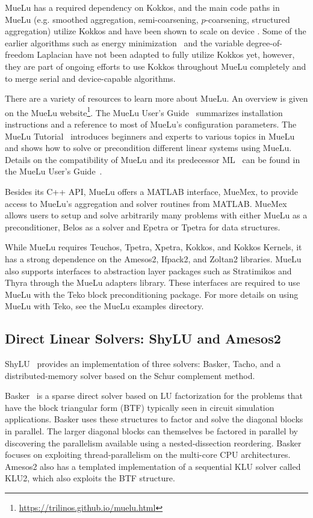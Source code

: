 MueLu has a required dependency on Kokkos,
and the main code paths in MueLu (e.g. smoothed aggregation, semi-coarsening, $p$-coarsening, structured aggregation)
utilize Kokkos and have been shown to scale on device \cite{BettencourtBrownEtAl2021_EmpirePic}.
Some of the earlier algorithms such as energy minimization~\cite{Sala2008a} and the variable degree-of-freedom Laplacian have not been adapted to fully utilize Kokkos yet,
however, they are part of ongoing efforts to use Kokkos throughout MueLu completely and to merge serial and device-capable algorithms.

There are a variety of resources to learn more about MueLu.
An overview is given on the MueLu website\footnote{\url{https://trilinos.github.io/muelu.html}}.
The MueLu User's Guide~\cite{BergerVergiat2023a} summarizes installation instructions and a reference to most of MueLu's configuration parameters.
The MueLu Tutorial~\cite{Mayr2023b} introduces beginners and experts to various topics in MueLu and shows how to solve or precondition different linear systems using MueLu.
Details on the compatibility of MueLu and its predecessor ML~\cite{Heroux2005a,Gee2006a} can be found in the MueLu User's Guide~\cite{BergerVergiat2023a}.

Besides its C++ API, MueLu offers a MATLAB interface, MueMex, to provide access to MueLu's aggregation and solver routines from MATLAB.
MueMex allows users to setup and solve arbitrarily many problems with either MueLu as a preconditioner, Belos as a solver and Epetra or Tpetra for data structures.

While MueLu requires Teuchos, Tpetra, Xpetra, Kokkos, and Kokkos Kernels, it has a strong dependence
on the Amesos2, Ifpack2, and Zoltan2 libraries.
MueLu also supports interfaces to abstraction layer packages such as Stratimikos and Thyra through the MueLu adapters library.
These interfaces are required to use MueLu with the Teko block preconditioning package.
For more details on using MueLu with Teko, see the MueLu examples directory.

\subsection{Direct Linear Solvers: ShyLU and Amesos2}

ShyLU~\cite{ShyLUCore2014} provides an implementation of three solvers: Basker, Tacho, and a distributed-memory solver based on the Schur complement method.

Basker~\cite{Basker2017} is a sparse direct solver based on LU factorization for the problems that have the block triangular form (BTF) typically seen in circuit simulation applications. Basker uses these structures to factor and solve the diagonal blocks in parallel. The larger diagonal blocks can themselves be factored in parallel by discovering the parallelism available using a nested-dissection reordering. Basker focuses on exploiting thread-parallelism on the multi-core CPU architectures. %
Amesos2 also has a templated implementation of a sequential KLU solver called KLU2, which also exploits the BTF structure.

